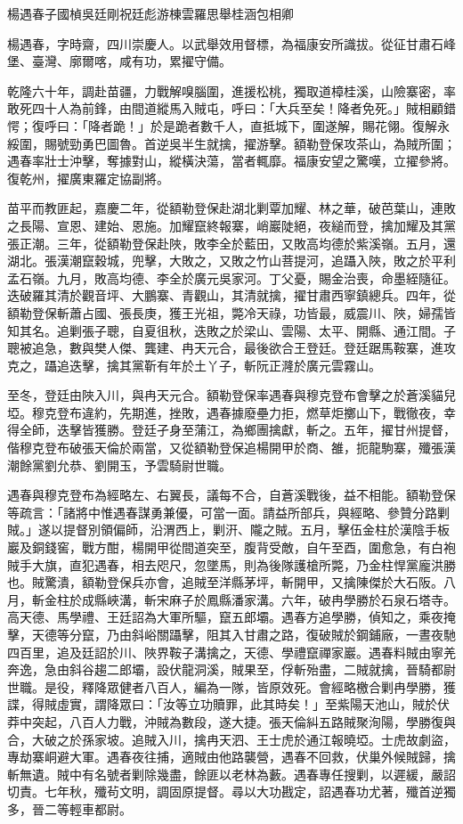 
\begin{pinyinscope}
楊遇春子國楨吳廷剛祝廷彪游棟雲羅思舉桂涵包相卿

楊遇春，字時齋，四川崇慶人。以武舉效用督標，為福康安所識拔。從征甘肅石峰堡、臺灣、廓爾喀，咸有功，累擢守備。

乾隆六十年，調赴苗疆，力戰解嗅腦圍，進援松桃，獨取道樟桂溪，山險寨密，率敢死四十人為前鋒，由間道縱馬入賊屯，呼曰：「大兵至矣！降者免死。」賊相顧錯愕；復呼曰：「降者跪！」於是跪者數千人，直抵城下，圍遂解，賜花翎。復解永綏圍，賜號勁勇巴圖魯。首逆吳半生就擒，擢游擊。額勒登保攻茶山，為賊所圍；遇春率壯士沖擊，奪據對山，縱橫決蕩，當者輒靡。福康安望之驚嘆，立擢參將。復乾州，擢廣東羅定協副將。

苗平而教匪起，嘉慶二年，從額勒登保赴湖北剿覃加耀、林之華，破芭葉山，連敗之長陽、宣恩、建始、恩施。加耀竄終報寨，峭巖陡絕，夜縋而登，擒加耀及其黨張正潮。三年，從額勒登保赴陜，敗李全於藍田，又敗高均德於紫溪嶺。五月，還湖北。張漢潮竄穀城，兜擊，大敗之，又敗之竹山菩提河，追躡入陜，敗之於平利孟石嶺。九月，敗高均德、李全於廣元吳家河。丁父憂，賜金治喪，命墨絰隨征。迭破羅其清於觀音坪、大鵬寨、青觀山，其清就擒，擢甘肅西寧鎮總兵。四年，從額勒登保斬蕭占國、張長庚，獲王光祖，斃冷天祿，功皆最，威震川、陜，婦孺皆知其名。追剿張子聰，自夏徂秋，迭敗之於梁山、雲陽、太平、開縣、通江間。子聰被追急，數與樊人傑、龔建、冉天元合，最後欲合王登廷。登廷踞馬鞍寨，進攻克之，躡追迭擊，擒其黨靳有年於土丫子，斬阮正漋於廣元雲霧山。

至冬，登廷由陜入川，與冉天元合。額勒登保率遇春與穆克登布會擊之於蒼溪貓兒埡。穆克登布違約，先期進，挫敗，遇春據廢壘力拒，燃草炬擲山下，戰徹夜，幸得全師，迭擊皆獲勝。登廷孑身至蒲江，為鄉團擒獻，斬之。五年，擢甘州提督，偕穆克登布破張天倫於兩當，又從額勒登保追楊開甲於商、雒，扼龍駒寨，殲張漢潮餘黨劉允恭、劉開玉，予雲騎尉世職。

遇春與穆克登布為經略左、右翼長，議每不合，自蒼溪戰後，益不相能。額勒登保等疏言：「諸將中惟遇春謀勇兼優，可當一面。請益所部兵，與經略、參贊分路剿賊。」遂以提督別領偏師，沿渭西上，剿汧、隴之賊。五月，擊伍金柱於漢陰手板巖及銅錢窖，戰方酣，楊開甲從間道突至，腹背受敵，自午至酉，圍愈急，有白袍賊手大旗，直犯遇春，相去咫尺，忽墜馬，則為後隊護槍所斃，乃金柱悍黨龐洪勝也。賊驚潰，額勒登保兵亦會，追賊至洋縣茅坪，斬開甲，又擒陳傑於大石阪。八月，斬金柱於成縣峽溝，斬宋麻子於鳳縣潘家溝。六年，破冉學勝於石泉石塔寺。高天德、馬學禮、王廷詔為大軍所驅，竄五郎壩。遇春方追學勝，偵知之，乘夜掩擊，天德等分竄，乃由斜峪關躡擊，阻其入甘肅之路，復破賊於鋼鋪廠，一晝夜馳四百里，追及廷詔於川、陜界鞍子溝擒之，天德、學禮竄禪家巖。遇春料賊由寧羌奔逸，急由斜谷趨二郎壩，設伏龍洞溪，賊果至，俘斬殆盡，二賊就擒，晉騎都尉世職。是役，釋降眾健者八百人，編為一隊，皆原效死。會經略檄合剿冉學勝，獲諜，得賊虛實，謂降眾曰：「汝等立功贖罪，此其時矣！」至紫陽天池山，賊於伏莽中突起，八百人力戰，沖賊為數段，遂大捷。張天倫糾五路賊聚洵陽，學勝復與合，大破之於孫家坡。追賊入川，擒冉天泗、王士虎於通江報曉埡。士虎故劇盜，專劫寨峒避大軍。遇春夜往捕，適賊由他路襲營，遇春不回救，伏巢外候賊歸，擒斬無遺。賊中有名號者剿除幾盡，餘匪以老林為藪。遇春專任搜剿，以遲緩，嚴詔切責。七年秋，殲茍文明，調固原提督。尋以大功戡定，詔遇春功尤著，殲首逆獨多，晉二等輕車都尉。


\end{pinyinscope}
